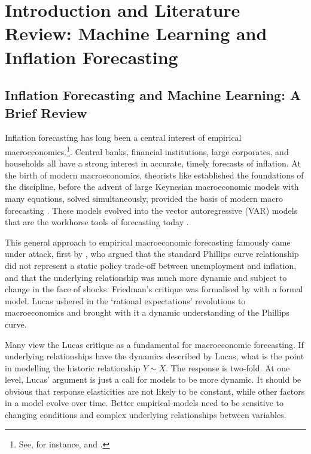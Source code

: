 \pagebreak
\section{Introduction and Literature Review: Machine Learning and Inflation Forecasting} \label{sec:lit}

\subsection{Inflation Forecasting and Machine Learning: A Brief Review} \label{sec:lit_review}

Inflation forecasting has long been a central interest of empirical macroeconomics.\footnote{See, for instance, \textcite{Gordon1990U.S.Unemployment} and \textcite{Stock1999ForecastingInflation}.}. Central banks, financial institutions, large corporates, and households all have a strong interest in accurate, timely forecasts of inflation. At the birth of modern macroeconomics, theorists like \textcite{Tinter1940Business1919-1932} established the foundations of the discipline, before the advent of large Keynesian macroeconomic models with many equations, solved simultaneously, provided the basis of modern macro forecasting \autocite{Ekeblad1952Economic1921-1941.}. These models evolved into the vector autoregressive (VAR) models that are the workhorse tools of forecasting today \autocite{Sims1982PolicyModels}.

This general approach to empirical macroeconomic forecasting famously came under attack, first by \textcite{Friedman1968ThePolicy}, who argued that the standard Phillips curve relationship \autocite{Phillips1958The186119571} did not represent a static policy trade-off between unemployment and inflation, and that the underlying relationship was much more dynamic and subject to change in the face of shocks. Friedman's critique was formalised by \textcite{Lucas1976EconometricCritique} with a formal model. Lucas ushered in the `rational expectations' revolutions to macroeconomics and brought with it a dynamic understanding of the Phillips curve. 

Many view the Lucas critique as a fundamental for macroeconomic forecasting. If underlying relationships have the dynamics described by Lucas, what is the point in modelling the historic relationship $Y \sim X $. The response is two-fold. At one level, Lucas' argument is just a call for models to be more dynamic. It should be obvious that response elasticities are not likely to be constant, while other factors in a model evolve over time. Better empirical models need to be sensitive to changing conditions and complex underlying relationships between variables.  

